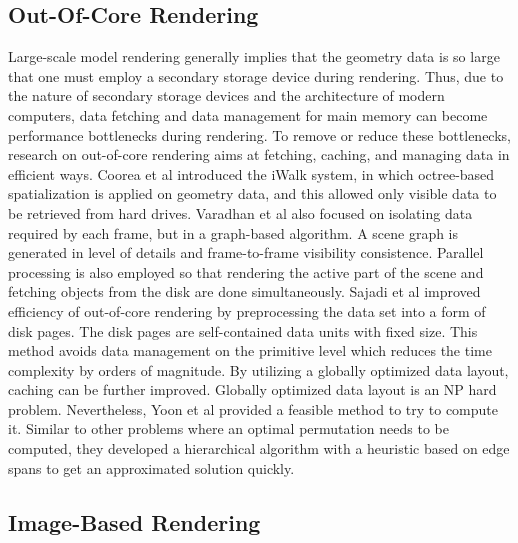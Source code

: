 \documentclass[conference]{acmsiggraph}
\begin{document}
\subsection{Out-Of-Core Rendering}

Large-scale model rendering generally implies that the geometry data is so large that one must employ a secondary storage device during rendering. Thus, due to the nature of secondary storage devices and the architecture of modern computers, data fetching and data management for main memory can become performance bottlenecks during rendering. To remove or reduce these bottlenecks, research on out-of-core rendering aims at fetching, caching, and managing data in efficient ways. Coorea et al \cite{iwalk} introduced the iWalk system, in which octree-based spatialization is applied on geometry data, and this allowed only visible data to be retrieved from hard drives. Varadhan et al \cite{outofcore} also focused on isolating data required by each frame, but in a graph-based algorithm. A scene graph is generated in level of details and frame-to-frame visibility consistence. Parallel processing is also employed so that rendering the active part of the scene and fetching objects from the disk are done simultaneously. Sajadi et al \cite{pagebased} improved efficiency of out-of-core rendering by preprocessing the data set into a form of disk pages. The disk pages are self-contained data units with fixed size. This method avoids data management on the primitive level which reduces the time complexity by orders of magnitude. By utilizing a globally optimized data layout, caching can be further improved. Globally optimized data layout is an NP hard problem. Nevertheless, Yoon et al \cite{cacheobliviouslayout} provided a feasible method to try to compute it. Similar to other problems where an optimal permutation needs to be computed, they developed a hierarchical algorithm with a heuristic based on edge spans to get an approximated solution quickly.

\subsection{Image-Based Rendering}
\end{document}
